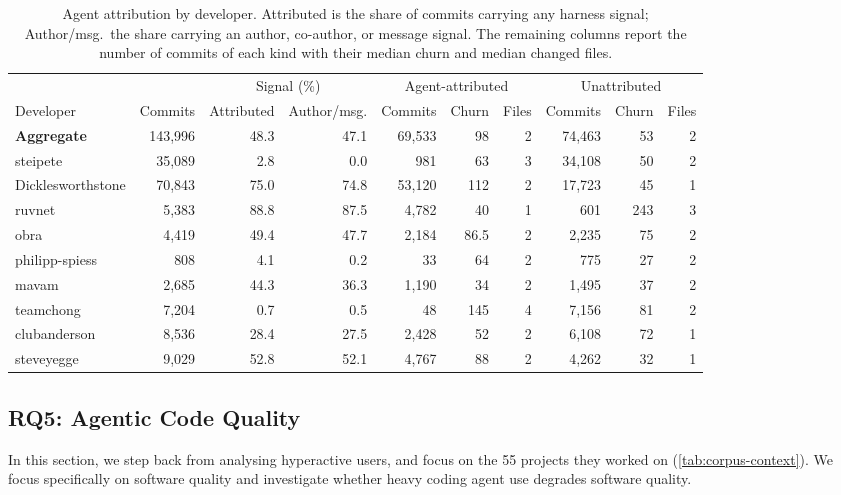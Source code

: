 \documentclass[smallextended]{svjour3}
\begin{document}
\begin{table}[tbp]
  \caption{Agent attribution by developer. Attributed is the share of commits
    carrying any harness signal; Author/msg.\ the share carrying an author,
    co-author, or message signal. The remaining columns report the number of
    commits of each kind with their median churn and median changed files.}
  \label{tab:rq4-attribution}
  \centering
  \scriptsize
  \setlength{\tabcolsep}{3.2pt}
  \begin{tabular}{lrrrrrrrrr}
    \toprule
    & & \multicolumn{2}{c}{Signal (\%)} & \multicolumn{3}{c}{Agent-attributed} & \multicolumn{3}{c}{Unattributed} \\
    \cmidrule(lr){3-4}\cmidrule(lr){5-7}\cmidrule(lr){8-10}
    Developer & Commits & Attributed & Author/msg. & Commits & Churn & Files & Commits & Churn & Files \\
    \midrule
    \textbf{Aggregate} & 143,996 & 48.3 & 47.1 & 69,533 & 98 & 2 & 74,463 & 53 & 2 \\
    steipete & 35,089 & 2.8 & 0.0 & 981 & 63 & 3 & 34,108 & 50 & 2 \\
    Dicklesworthstone & 70,843 & 75.0 & 74.8 & 53,120 & 112 & 2 & 17,723 & 45 & 1 \\
    ruvnet & 5,383 & 88.8 & 87.5 & 4,782 & 40 & 1 & 601 & 243 & 3 \\
    obra & 4,419 & 49.4 & 47.7 & 2,184 & 86.5 & 2 & 2,235 & 75 & 2 \\
    philipp-spiess & 808 & 4.1 & 0.2 & 33 & 64 & 2 & 775 & 27 & 2 \\
    mavam & 2,685 & 44.3 & 36.3 & 1,190 & 34 & 2 & 1,495 & 37 & 2 \\
    teamchong & 7,204 & 0.7 & 0.5 & 48 & 145 & 4 & 7,156 & 81 & 2 \\
    clubanderson & 8,536 & 28.4 & 27.5 & 2,428 & 52 & 2 & 6,108 & 72 & 1 \\
    steveyegge & 9,029 & 52.8 & 52.1 & 4,767 & 88 & 2 & 4,262 & 32 & 1 \\
    \bottomrule
  \end{tabular}
\end{table}


\subsection{RQ5: Agentic Code Quality}
\label{sec:rq5-results}

In this section, we step back from analysing hyperactive  users, and
focus on the 55 projects they worked on (\autoref{tab:corpus-context}). We focus specifically on software quality and investigate whether heavy coding agent use degrades software quality.
\end{document}
